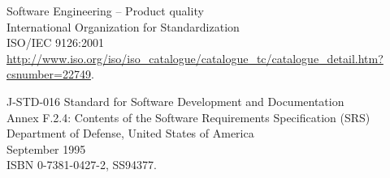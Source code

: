 \begin{thebibliography}{99}
	Software Engineering -- Product quality\\
	International Organization for Standardization\\
	ISO/IEC 9126:2001\\
	\url{http://www.iso.org/iso/iso_catalogue/catalogue_tc/catalogue_detail.htm?csnumber=22749}.

	J-STD-016 Standard for Software Development and Documentation\\
	Annex F.2.4: Contents of the Software Requirements Specification (SRS)\\
	Department of Defense, United States of America\\
	September 1995\\
	ISBN 0-7381-0427-2, SS94377.

\end{thebibliography}